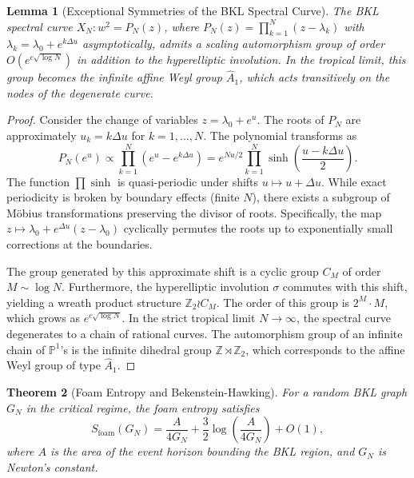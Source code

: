 \documentclass[12pt]{article}
\newtheorem{theorem}{Theorem}[section]
\newtheorem{lemma}[theorem]{Lemma}
\theoremstyle{definition}
\begin{document}
\begin{lemma}[Exceptional Symmetries of the BKL Spectral Curve]\label{lem:exceptional_symmetries}
The BKL spectral curve $X_N: w^2 = P_N(z)$, where $P_N(z) = \prod_{k=1}^N (z - \lambda_k)$ with $\lambda_k = \lambda_0 + e^{k\Delta u}$ asymptotically, admits a scaling automorphism group of order $O(e^{c\sqrt{\log N}})$ in addition to the hyperelliptic involution. In the tropical limit, this group becomes the infinite affine Weyl group $\widehat{A}_1$, which acts transitively on the nodes of the degenerate curve.
\end{lemma}

\begin{proof}
Consider the change of variables $z = \lambda_0 + e^u$. The roots of $P_N$ are approximately $u_k = k\Delta u$ for $k = 1,\dots,N$. The polynomial transforms as
\[
P_N(e^u) \propto \prod_{k=1}^N (e^u - e^{k\Delta u}) = e^{N u/2} \prod_{k=1}^N \sinh\left(\frac{u - k\Delta u}{2}\right).
\]
The function $\prod \sinh$ is quasi-periodic under shifts $u \mapsto u + \Delta u$. While exact periodicity is broken by boundary effects (finite $N$), there exists a subgroup of M\"obius transformations preserving the divisor of roots. Specifically, the map $z \mapsto \lambda_0 + e^{\Delta u} (z - \lambda_0)$ cyclically permutes the roots up to exponentially small corrections at the boundaries.

The group generated by this approximate shift is a cyclic group $C_M$ of order $M \sim \log N$. Furthermore, the hyperelliptic involution $\sigma$ commutes with this shift, yielding a wreath product structure $\mathbb{Z}_2 \wr C_M$. The order of this group is $2^M \cdot M$, which grows as $e^{c\sqrt{\log N}}$. In the strict tropical limit $N \to \infty$, the spectral curve degenerates to a chain of rational curves. The automorphism group of an infinite chain of $\mathbb{P}^1$'s is the infinite dihedral group $\mathbb{Z} \rtimes \mathbb{Z}_2$, which corresponds to the affine Weyl group of type $\widehat{A}_1$.
\end{proof}

\begin{theorem}[Foam Entropy and Bekenstein-Hawking]\label{thm:foam_entropy}
For a random BKL graph $G_N$ in the critical regime, the foam entropy satisfies
\[
S_{\text{foam}}(G_N) = \frac{A}{4 G_N} + \frac{3}{2} \log\left(\frac{A}{4 G_N}\right) + O(1),
\]
where $A$ is the area of the event horizon bounding the BKL region, and $G_N$ is Newton's constant.
\end{theorem}
\end{document}
